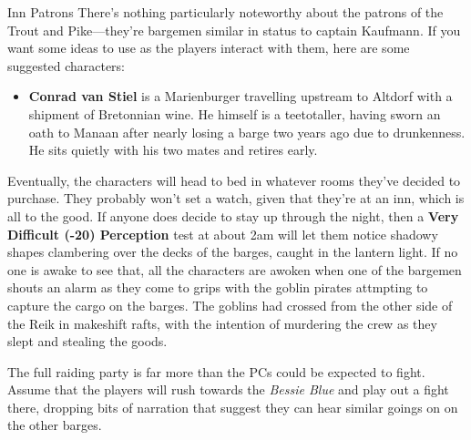\begin{gmnote}{Inn Patrons}
There's nothing particularly noteworthy about the patrons of the Trout and
Pike---they're bargemen similar in status to captain Kaufmann. If you want
some ideas to use as the players interact with them, here are some suggested
characters:
\begin{itemize}
    \item \textbf{Conrad van Stiel} is a Marienburger travelling upstream to Altdorf
            with a shipment of Bretonnian wine. He himself is a teetotaller,
            having sworn an oath to Manaan after nearly losing a barge two years
            ago due to drunkenness. He sits quietly with his two mates and
            retires early.
\end{itemize}
\end{gmnote}

Eventually, the characters will head to bed in whatever rooms they've
decided to purchase. They probably won't set a watch, given that they're at
an inn, which is all to the good. If anyone does decide to stay up through
the night, then a \textbf{Very Difficult (-20) Perception} test at about
2am will let them notice shadowy shapes clambering over the decks of the
barges, caught in the lantern light. If no one is awake to see that, all the
characters are awoken when one of the bargemen shouts an alarm as they come to
grips with the goblin pirates attmpting to capture the cargo on the barges.
The goblins had crossed from the other side of the Reik in makeshift rafts,
with the intention of murdering the crew as they slept and stealing the goods.

The full raiding party is far more than the PCs could be expected to fight.
Assume that the players will rush towards the \textit{Bessie Blue} and play
out a fight there, dropping bits of narration that suggest they can hear
similar goings on on the other barges.